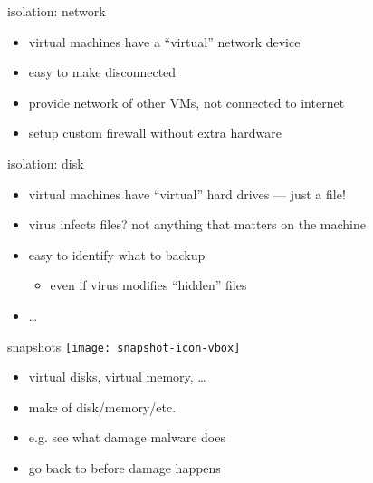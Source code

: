 \begin{frame}{isolation: network}
    \begin{itemize}
    \item virtual machines have a ``virtual'' network device
    \vspace{1cm}
    \item easy to make disconnected
    \item provide network of other VMs, not connected to internet
    \item setup custom firewall without extra hardware
    \end{itemize}
\end{frame}

\begin{frame}{isolation: disk}
    \begin{itemize}
    \item virtual machines have ``virtual'' hard drives --- just a file!
    \vspace{1cm}
    \item virus infects files? not anything that matters on the machine
    \item easy to identify what to backup
        \begin{itemize}
        \item even if virus modifies ``hidden'' files
        \end{itemize}
    \item \ldots
    \end{itemize}
\end{frame}


\begin{frame}{snapshots}
    \texttt{[image: snapshot-icon-vbox]}
    \begin{itemize}
    \item virtual disks, virtual memory, \ldots
    \vspace{1cm}
    \item make  of disk/memory/etc.
    \item e.g. see what damage malware does
    \item go back to before damage happens
    \end{itemize}
\end{frame}

